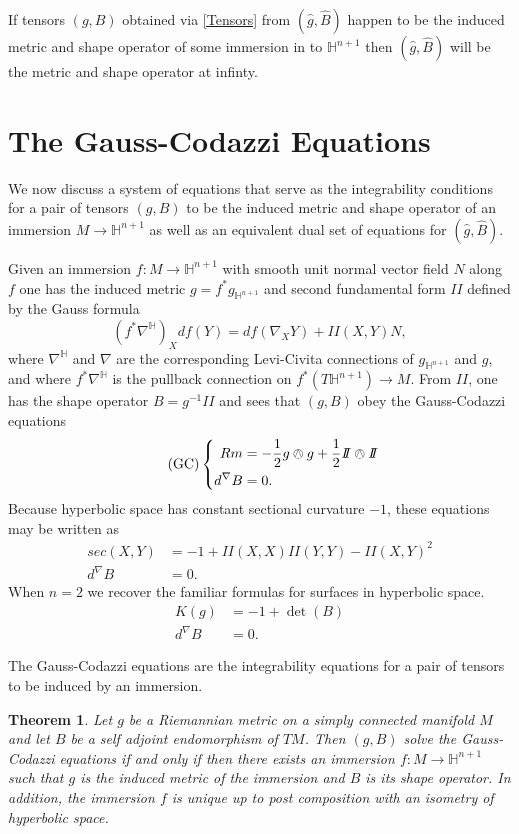 \documentclass{amsart}
\newcommand{\two}{I\!\!I}
\newtheorem{thm}{Theorem}[section]
\renewcommand{\H}{\mathbb{H}}
\begin{document}
If tensors $(g,B)$ obtained via \eqref{Tensors} from $(\hat{g},\hat{B})$ happen to be the induced metric and shape operator of some immersion in to $\H^{n+1}$ then $(\hat{g},\hat{B})$ will be the metric and shape operator at infinty. 


\section{The Gauss-Codazzi Equations}
We now discuss a system of equations that serve as the integrability conditions for a pair of tensors $(g,B)$ to be the induced metric and shape operator of an immersion $M \to \H^{n+1}$ as well as an equivalent dual set of equations for $(\hat{g},\hat{B})$.

Given an immersion $f: M \to \H^{n+1}$ with smooth unit normal vector field $N$ along $f$ one has the induced metric $g = f^*g_{\H^{n+1}}$ and second fundamental form $\two$ defined by the Gauss formula
\[
(f^*\nabla^{\H})_Xdf(Y) = df(\nabla_XY) + \two(X,Y)N,
\]
where $\nabla^\H$ and $\nabla$ are the corresponding Levi-Civita connections of $g_{\H^{n+1}}$ and $g$, and where $f^*\nabla^\H$ is the pullback connection on $f^*(T\H^{n+1}) \to M$.
From $\two$, one has the shape operator $B = g^{-1}\two$ and sees that $(g,B)$ obey the Gauss-Codazzi equations
\begin{equation}
\label{GC} \tag{GC}
\left\{
\begin{aligned}
Rm &= -\frac{1}{2}g \owedge g + \frac{1}{2}\two \owedge \two \\
d^\nabla B &= 0.
\end{aligned}
\right.
\end{equation}
Because hyperbolic space has constant sectional curvature $-1$, these equations may be written as
\begin{align*}
sec(X,Y) &= -1 + \two(X,X)\two(Y,Y) - \two(X,Y)^2 \\
d^\nabla B &= 0.
\end{align*}
When $n = 2$ we recover the familiar formulas for surfaces in hyperbolic space. 
\begin{align*}
K(g) &= -1 + \det(B) \\
d^\nabla B &= 0. 
\end{align*}

The Gauss-Codazzi equations are the integrability equations for a pair of tensors to be induced by an immersion.

\begin{thm}
Let $g$ be a Riemannian metric on a simply connected manifold $M$ and let $B$ be a self adjoint endomorphism of $TM$. 
Then $(g,B)$ solve the Gauss-Codazzi equations if and only if then there exists an immersion $f: M \to \H^{n+1}$ such that $g$ is the induced metric of the immersion and $B$ is its shape operator. 
In addition, the immersion $f$ is unique up to post composition with an isometry of hyperbolic space. 
\end{thm}
\end{document}
